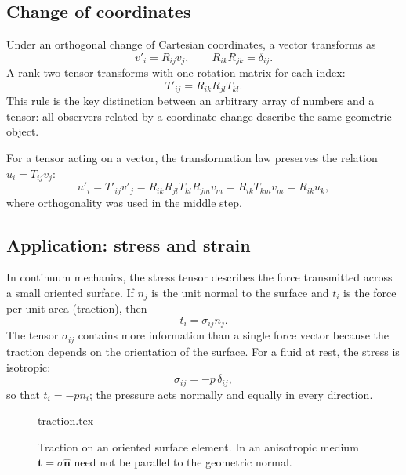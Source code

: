 \subsection{Change of coordinates}
Under an orthogonal change of Cartesian coordinates, a vector transforms as
\begin{equation}
v'_i=R_{ij}v_j,
\qquad
R_{ik}R_{jk}=\delta_{ij}.
\end{equation}
A rank-two tensor transforms with one rotation matrix for each index:
\begin{equation}
T'_{ij}=R_{ik}R_{jl}T_{kl}.
\end{equation}
This rule is the key distinction between an arbitrary array of numbers and a tensor: all observers related by a coordinate change describe the same geometric object.

For a tensor acting on a vector, the transformation law preserves the relation $u_i=T_{ij}v_j$:
\begin{equation}
u'_i=T'_{ij}v'_j
=R_{ik}R_{jl}T_{kl}R_{jm}v_m
=R_{ik}T_{km}v_m
=R_{ik}u_k,
\end{equation}
where orthogonality was used in the middle step.

\subsection{Application: stress and strain}
In continuum mechanics, the stress tensor describes the force transmitted across a small oriented surface. If $n_j$ is the unit normal to the surface and $t_i$ is the force per unit area (traction), then
\begin{equation}
t_i=\sigma_{ij}n_j.
\end{equation}
The tensor $\sigma_{ij}$ contains more information than a single force vector because the traction depends on the orientation of the surface. For a fluid at rest, the stress is isotropic:
\begin{equation}
\sigma_{ij}=-p\,\delta_{ij},
\end{equation}
so that $t_i=-pn_i$; the pressure acts normally and equally in every direction.

\begin{figure}[htb]
    \centering
    {traction.tex}
    \caption{Traction on an oriented surface element. In an anisotropic medium $\mathbf{t}=\sigma\hat{\mathbf{n}}$ need not be parallel to the geometric normal.}
    \label{fig:vec-traction}
\end{figure}


